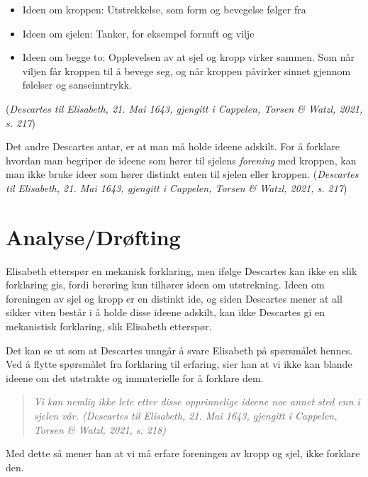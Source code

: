 \documentclass[12pt, a4paper]{article}
\begin{document}
\begin{itemize}
    \item Ideen om kroppen: Utstrekkelse, som form og bevegelse følger fra
    \item Ideen om sjelen: Tanker, for eksempel fornuft og vilje
    \item Ideen om begge to: Opplevelsen av at sjel og kropp virker sammen. Som når viljen får kroppen til å bevege seg, og når kroppen påvirker sinnet gjennom følelser og sanseinntrykk.
\end{itemize}

(\textit{Descartes til Elisabeth, 21. Mai 1643, gjengitt i Cappelen, Torsen \& Watzl, 2021, s. 217})

\begin{flushleft}
    Det andre Descartes antar, er at man må holde ideene adskilt. For å forklare hvordan man begriper de ideene som hører til sjelens \textit{forening} med kroppen, kan man ikke bruke ideer som hører distinkt enten til sjelen eller kroppen. (\textit{Descartes til Elisabeth, 21. Mai 1643, gjengitt i Cappelen, Torsen \& Watzl, 2021, s. 217})
\end{flushleft}



\section{Analyse/Drøfting}

\begin{flushleft}
    Elisabeth etterspør en mekanisk forklaring, men ifølge Descartes kan ikke en slik forklaring gis, fordi berøring kun tilhører ideen om utstrekning. Ideen om foreningen av sjel og kropp er en distinkt ide, og siden Descartes mener at all sikker viten består i å holde disse ideene adskilt, kan ikke Descartes gi en mekanistisk forklaring, slik Elisabeth etterspør.
\end{flushleft}

\begin{flushleft}
    Det kan se ut som at Descartes unngår å svare Elisabeth på spørsmålet hennes. Ved å flytte spørsmålet fra forklaring til erfaring, sier han at vi ikke kan blande ideene om det utstrakte og immaterielle for å forklare dem.

    \begin{quote}
        \textit{Vi kan nemlig ikke lete etter disse opprinnelige ideene noe annet sted enn i sjelen vår. (\textit{Descartes til Elisabeth, 21. Mai 1643, gjengitt i Cappelen, Torsen \& Watzl, 2021, s. 218})}
    \end{quote}

    Med dette så mener han at vi må erfare foreningen av kropp og sjel, ikke forklare den.
\end{flushleft}
\end{document}
